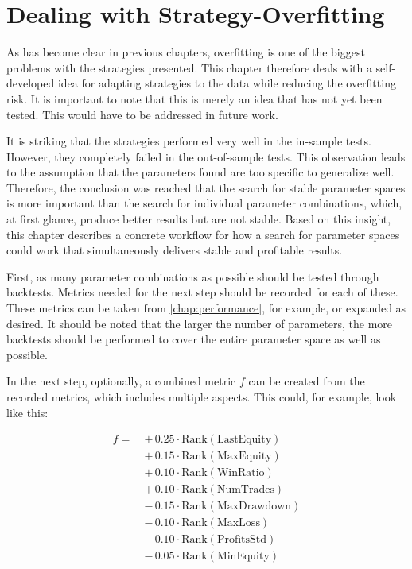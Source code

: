 \section{Dealing with Strategy-Overfitting}
\label{chap:overfitting}

As has become clear in previous chapters, overfitting is one of the biggest problems with the strategies presented.
This chapter therefore deals with a self-developed idea for adapting strategies to the data while reducing the overfitting risk.
It is important to note that this is merely an idea that has not yet been tested.
This would have to be addressed in future work.

It is striking that the strategies performed very well in the in-sample tests.
However, they completely failed in the out-of-sample tests.
This observation leads to the assumption that the parameters found are too specific to generalize well.
Therefore, the conclusion was reached that the search for stable parameter spaces is more important than the search for individual parameter combinations, which, at first glance, produce better results but are not stable.
Based on this insight, this chapter describes a concrete workflow for how a search for parameter spaces could work that simultaneously delivers stable and profitable results.

First, as many parameter combinations as possible should be tested through backtests.
Metrics needed for the next step should be recorded for each of these.
These metrics can be taken from \autoref{chap:performance}, for example, or expanded as desired.
It should be noted that the larger the number of parameters, the more backtests should be performed to cover the entire parameter space as well as possible.

In the next step, optionally, a combined metric $f$ can be created from the recorded metrics, which includes multiple aspects.
This could, for example, look like this:

\[
    \begin{aligned}
        f =\ &+\, 0.25 \cdot \text{Rank}(\text{LastEquity}) \\
        &+\, 0.15 \cdot \text{Rank}(\text{MaxEquity}) \\
        &+\, 0.10 \cdot \text{Rank}(\text{WinRatio}) \\
        &+\, 0.10 \cdot \text{Rank}(\text{NumTrades}) \\
        &-\, 0.15 \cdot \text{Rank}(\text{MaxDrawdown}) \\
        &-\, 0.10 \cdot \text{Rank}(\text{MaxLoss}) \\
        &-\, 0.10 \cdot \text{Rank}(\text{ProfitsStd}) \\
        &-\, 0.05 \cdot \text{Rank}(\text{MinEquity})
    \end{aligned}
\]


